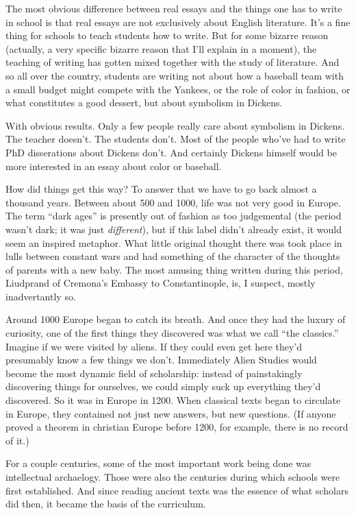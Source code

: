 The most obvious difference between real essays and the things one has
to write in school is that real essays are not exclusively about English
literature. It's a fine thing for schools to teach students how to
write. But for some bizarre reason (actually, a very specific bizarre
reason that I'll explain in a moment), the teaching of writing has
gotten mixed together with the study of literature. And so all over the
country, students are writing not about how a baseball team with a small
budget might compete with the Yankees, or the role of color in fashion,
or what constitutes a good dessert, but about symbolism in Dickens.

With obvious results. Only a few people really care about symbolism in
Dickens. The teacher doesn't. The students don't. Most of the people
who've had to write PhD disserations about Dickens don't. And certainly
Dickens himself would be more interested in an essay about color or
baseball.

How did things get this way? To answer that we have to go back almost a
thousand years. Between about 500 and 1000, life was not very good in
Europe. The term ``dark ages'' is presently out of fashion as too
judgemental (the period wasn't dark; it was just \emph{different}), but
if this label didn't already exist, it would seem an inspired metaphor.
What little original thought there was took place in lulls between
constant wars and had something of the character of the thoughts of
parents with a new baby. The most amusing thing written during this
period, Liudprand of Cremona's Embassy to Constantinople, is, I suspect,
mostly inadvertantly so.

Around 1000 Europe began to catch its breath. And once they had the
luxury of curiosity, one of the first things they discovered was what we
call ``the classics.'' Imagine if we were visited by aliens. If they
could even get here they'd presumably know a few things we don't.
Immediately Alien Studies would become the most dynamic field of
scholarship: instead of painstakingly discovering things for ourselves,
we could simply suck up everything they'd discovered. So it was in
Europe in 1200. When classical texts began to circulate in Europe, they
contained not just new answers, but new questions. (If anyone proved a
theorem in christian Europe before 1200, for example, there is no record
of it.)

For a couple centuries, some of the most important work being done was
intellectual archaelogy. Those were also the centuries during which
schools were first established. And since reading ancient texts was the
essence of what scholars did then, it became the basis of the
curriculum.

